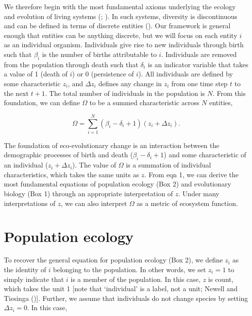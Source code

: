 \documentclass[
]{article}
\begin{document}
We therefore begin with the most fundamental axioms underlying the
ecology and evolution of living systems (; ). In such
systems, diversity is discontinuous and can be defined in terms of
discrete entities (). Our
framework is general enough that entities can be anything discrete, but
we will focus on each entity \(i\) as an individual organism.
Individuals give rise to new individuals through birth such that
\(\beta_{i}\) is the number of births attributable to \(i\). Individuals
are removed from the population through death such that \(\delta_{i}\)
is an indicator variable that takes a value of 1 (death of \(i\)) or 0
(persistence of \(i\)). All individuals are defined by some
characteristic \(z_{i}\), and \(\Delta z_{i}\) defines any change in
\(z_{i}\) from one time step \(t\) to the next \(t + 1\). The total
number of individuals in the population is \(N\). From this foundation,
we can define \(\Omega\) to be a summed characteristic across \(N\)
entities,

\[\Omega = \sum_{i=1}^{N} \left(\beta_{i} - \delta_{i} + 1 \right)\left(z_{i} + \Delta z_{i} \right).
\tag{1}
\]

The foundation of eco-evolutionary change is an interaction between the
demographic processes of birth and death
(\(\beta_{i} - \delta_{i} + 1\)) and some characteristic of an
individual (\(z_{i} + \Delta z_{i}\)). The value of \(\Omega\) is a
summation of individual characteristics, which takes the same units as
\(z\). From eqn 1, we can derive the most fundamental equations of
population ecology (Box 2) and evolutionary biology (Box 1) through an
appropriate interpretation of \(z\). Under many interpretations of
\(z\), we can also interpret \(\Omega\) as a metric of ecosystem
function.

\section{Population ecology}\label{population-ecology}

To recover the general equation for population ecology (Box 2), we
define \(z_{i}\) as the identity of \(i\) belonging to the population.
In other words, we set \(z_{i} = 1\) to simply indicate that \(i\) is a
member of the population. In this case, \(z\) is count, which takes the
unit 1 {[}note that `individual' is a label, not a unit; Newell and
Tiesinga (){]}. Further, we assume
that individuals do not change species by setting \(\Delta z_{i} = 0\).
In this case,
\end{document}
